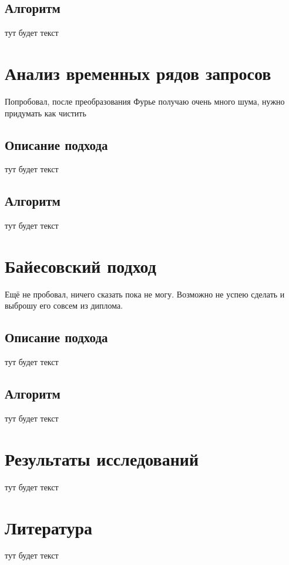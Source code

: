 \documentclass[14pt]{extreport}
\begin{document}
	\section{Алгоритм}
	тут будет текст

	\chapter{Анализ временных рядов запросов}
	Попробовал, после преобразования Фурье получаю очень много шума, нужно придумать как чистить
	\section{Описание подхода}
	тут будет текст
	\section{Алгоритм}
	тут будет текст
	
	\chapter{Байесовский подход}
	Ещё не пробовал, ничего сказать пока не могу. Возможно не успею сделать и выброшу его совсем из диплома.
	\section{Описание подхода}
	тут будет текст
	\section{Алгоритм}
	тут будет текст

	\chapter{Результаты исследований}
	тут будет текст
	
	\chapter{Литература}
	тут будет текст
	
	
\end{document}
